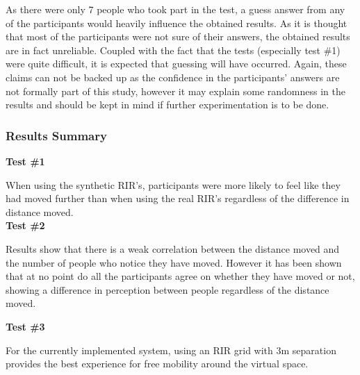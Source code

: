 \documentclass[../../main.tex]{subfiles}
\begin{document}
				As there were only 7 people who took part in the test, a guess answer from any of the participants would heavily influence the obtained results. As it is thought that most of the participants were not sure of their answers, the obtained results are in fact unreliable. Coupled with the fact that the tests (especially test \#1) were quite difficult, it is expected that guessing will have occurred. Again, these claims can not be backed up as the confidence in the participants' answers are not formally part of this study, however it may explain some randomness in the results and should be kept in mind if further experimentation is to be done.



			\subsubsection{Results Summary}


				
				\textbf{Test \#1}

				When using the synthetic \ac{RIR}'s, participants were more likely to feel like they had moved further than when using the real \ac{RIR}'s regardless of the difference in distance moved. \\

				\textbf{Test \#2}

				Results show that there is a weak correlation between the distance moved and the number of people who notice they have moved. However it has been shown that at no point do all the participants agree on whether they have moved or not, showing a difference in perception between people regardless of the distance moved.
				
				\textbf{Test \#3}

				For the currently implemented system, using an \ac{RIR} grid with 3m separation provides the best experience for free mobility around the virtual space.
			


			
\end{document}
